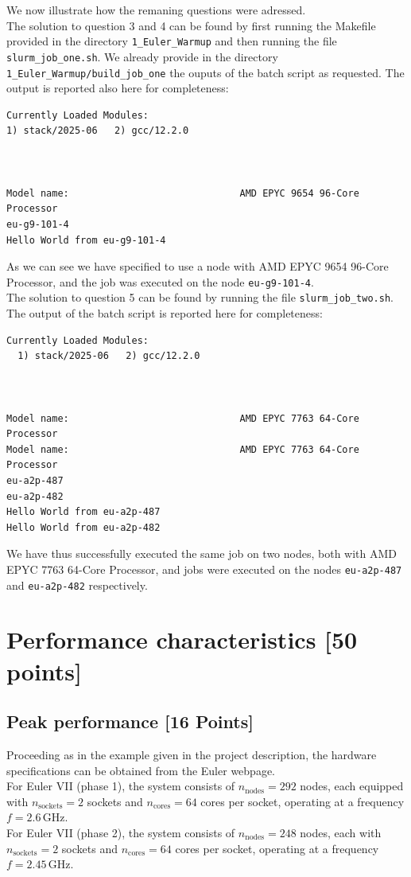 \documentclass[unicode,10pt,a4paper,oneside,numbers=endperiod,openany]{scrartcl}
\begin{document}
We now illustrate how the remaning questions were adressed.\\
The solution to question 3 and 4 can be found by first running the Makefile provided in the directory \texttt{1\_Euler\_Warmup} and then running the file \texttt{slurm\_job\_one.sh}. We already provide in the directory \\ \texttt{1\_Euler\_Warmup}\texttt{/build\_job\_one}
the ouputs of the batch script as requested. The output is reported also here for completeness:
\begin{lstlisting}[style=grayverbatim]
Currently Loaded Modules:
1) stack/2025-06   2) gcc/12.2.0



Model name:                              AMD EPYC 9654 96-Core Processor
eu-g9-101-4
Hello World from eu-g9-101-4
\end{lstlisting}
As we can see we have specified to use a node with AMD EPYC 9654 96-Core Processor, and the job was executed on the node \texttt{eu-g9-101-4}. \\
The solution to question 5 can be found by running the file \texttt{slurm\_job\_two.sh}. The output of the batch script is reported here for completeness:
\begin{lstlisting}[style=grayverbatim]
Currently Loaded Modules:
  1) stack/2025-06   2) gcc/12.2.0



Model name:                              AMD EPYC 7763 64-Core Processor
Model name:                              AMD EPYC 7763 64-Core Processor
eu-a2p-487
eu-a2p-482
Hello World from eu-a2p-487
Hello World from eu-a2p-482
\end{lstlisting}
We have thus successfully executed the same job on two nodes, both with AMD EPYC 7763 64-Core Processor, and jobs were executed on the nodes \texttt{eu-a2p-487} and \texttt{eu-a2p-482} respectively.
\newpage
\section{Performance characteristics [50 points]}

\subsection{Peak performance [16 Points]}

Proceeding as in the example given in the project description, the hardware specifications can be obtained from the Euler webpage. \\
For Euler VII (phase 1), the system consists of $n_{\text{nodes}} = 292$ nodes, each equipped with $n_{\text{sockets}} = 2$ sockets and $n_{\text{cores}} = 64$ cores per socket, operating at a frequency $f = 2.6\,\text{GHz}$.\\
 For Euler VII (phase 2), the system consists of $n_{\text{nodes}} = 248$ nodes, each with $n_{\text{sockets}} = 2$ sockets and $n_{\text{cores}} = 64$ cores per socket, operating at a frequency $f = 2.45\,\text{GHz}$.\\
\end{document}
